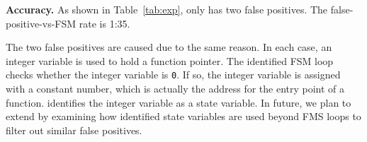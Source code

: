 \noindent\textbf{Accuracy.}
As shown in Table~\ref{tab:exp}, \Tool{} only has two false positives.
The false-positive-vs-FSM rate is 1:35. 

The two false positives are caused due to the same reason. 
In each case, an integer variable is used to hold a function pointer. 
The identified FSM loop checks whether the integer variable is \texttt{0}. 
If so, the integer variable is assigned with a constant number, 
which is actually the address for the entry point of a function. 
\Tool{} identifies the integer variable as a state variable.  
In future, we plan to extend \Tool{} by examining how identified 
state variables are used beyond FMS 
loops to filter out similar false positives. 




